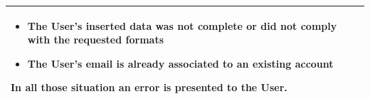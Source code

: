\documentclass[11pt]{article}
\begin{document}
\begin{description}
\begin{table}[H]
\begin{tabularx}{\textwidth}{|>{\hsize=0.5\hsize}X|>{\hsize=1.5\hsize}X|}
                \begin{minipage}[t]{\hsize}
                \vspace{0pt}
                \begin{itemize}[topsep=0pt, leftmargin=*]
                    \item The User's inserted data was not complete or did not comply with the requested formats
                    \item The User's email is already associated to an existing account
                \end{itemize}
                \vspace{8pt}
                \end{minipage}
                In all those situation an error is presented to the User.
                \vspace{6pt}
            \\
            \hline
        \end{tabularx}
    \end{table}
    

\end{description}
\end{document}
